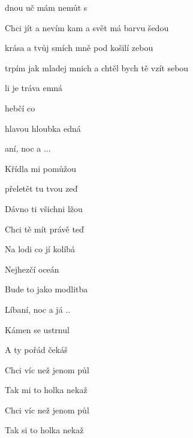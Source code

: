 

\zs
{}dnou uč mám  nemůt s 

Chci jít a nevím kam a svět má barvu šedou

krása a tvůj smích mně pod košilí zebou

trpím jak mladej mnich a chtěl bych tě vzít sebou
\ks

\zr
{}li je tráva emná

hebčí co 

 hlavou hloubka edná

aní, noc a ...
\kr

\zs
Křídla mi pomůžou

přeletět tu tvou zeď

Dávno ti všichni lžou

Chci tě mít právě teď

\ks

\zr
Na lodi co jí kolíbá

Nejhezčí oceán

Bude to jako modlitba

Líbaní, noc a já ..
\kr

\zs
Kámen se ustrnul

A ty pořád čekáš

Chci víc než jenom půl

Tak mi to holka nekaž


Chci víc než jenom půl

Tak si to holka nekaž

\ks

\kp


















